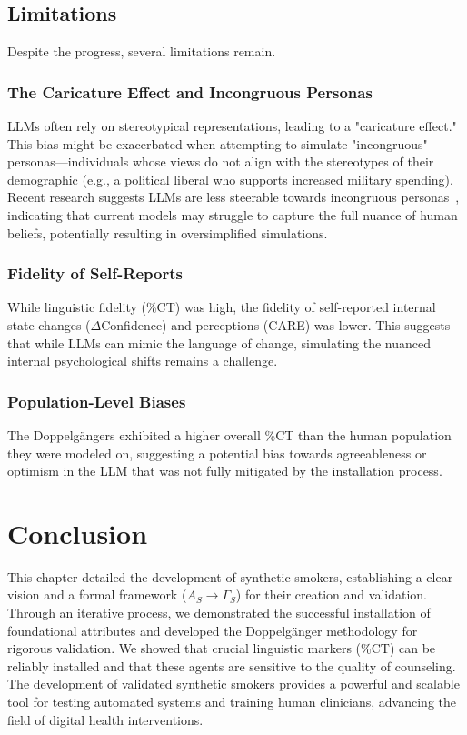 \subsection{Limitations}

Despite the progress, several limitations remain.

\subsubsection{The Caricature Effect and Incongruous Personas}

LLMs often rely on stereotypical representations, leading to a "caricature effect." This bias might be exacerbated when attempting to simulate "incongruous" personas—individuals whose views do not align with the stereotypes of their demographic (e.g., a political liberal who supports increased military spending). Recent research suggests LLMs are less steerable towards incongruous personas~\citep{liu2024evaluating}, indicating that current models may struggle to capture the full nuance of human beliefs, potentially resulting in oversimplified simulations.

\subsubsection{Fidelity of Self-Reports}

While linguistic fidelity (\%CT) was high, the fidelity of self-reported internal state changes ($\Delta$Confidence) and perceptions (CARE) was lower. This suggests that while LLMs can mimic the language of change, simulating the nuanced internal psychological shifts remains a challenge.

\subsubsection{Population-Level Biases}

The Doppelgängers exhibited a higher overall \%CT than the human population they were modeled on, suggesting a potential bias towards agreeableness or optimism in the LLM that was not fully mitigated by the installation process.

\section{Conclusion}

This chapter detailed the development of synthetic smokers, establishing a clear vision and a formal framework ($A_S \rightarrow \Gamma_S$) for their creation and validation. Through an iterative process, we demonstrated the successful installation of foundational attributes and developed the Doppelgänger methodology for rigorous validation. We showed that crucial linguistic markers (\%CT) can be reliably installed and that these agents are sensitive to the quality of counseling. The development of validated synthetic smokers provides a powerful and scalable tool for testing automated systems and training human clinicians, advancing the field of digital health interventions.
